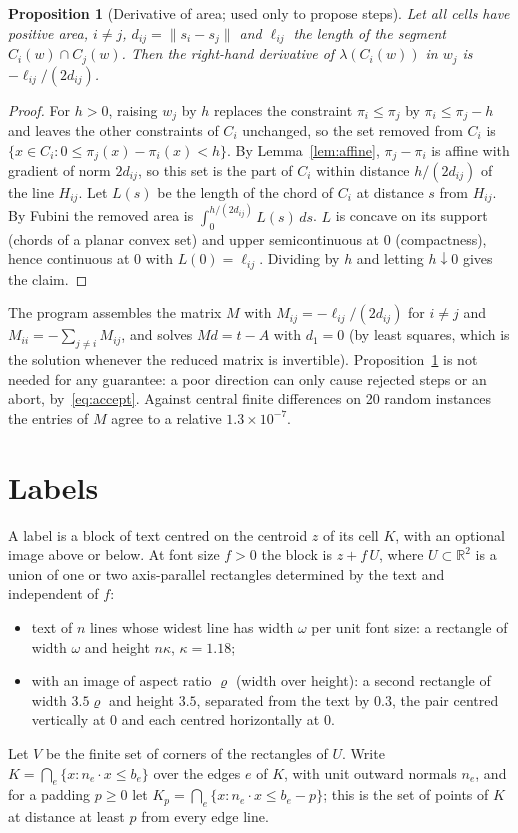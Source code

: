 \documentclass[11pt,a4paper]{article}
\theoremstyle{plain}
\newtheorem{proposition}[theorem]{Proposition}
\theoremstyle{definition}
\theoremstyle{remark}
\newcommand{\R}{\mathbb{R}}
\newcommand{\area}{\lambda}
\newcommand{\norm}[1]{\lVert #1\rVert}
\begin{document}
\begin{proposition}[Derivative of area; used only to propose steps]\label{prop:derivative}
Let all cells have positive area, $i\ne j$, $d_{ij}=\norm{s_i-s_j}$ and
$\ell_{ij}$ the length of the segment $C_i(w)\cap C_j(w)$. Then the
right-hand derivative of $\area(C_i(w))$ in $w_j$ is
$-\ell_{ij}/(2d_{ij})$.
\end{proposition}
\begin{proof}
For $h>0$, raising $w_j$ by $h$ replaces the constraint $\pi_i\le\pi_j$ by
$\pi_i\le\pi_j-h$ and leaves the other constraints of $C_i$ unchanged, so the
set removed from $C_i$ is $\{x\in C_i: 0\le\pi_j(x)-\pi_i(x)<h\}$. By
Lemma~\ref{lem:affine}, $\pi_j-\pi_i$ is affine with gradient of norm
$2d_{ij}$, so this set is the part of $C_i$ within distance $h/(2d_{ij})$ of
the line $H_{ij}$. Let $L(s)$ be the length of the chord of $C_i$ at distance
$s$ from $H_{ij}$. By Fubini the removed area is $\int_0^{h/(2d_{ij})}L(s)\,ds$.
$L$ is concave on its support (chords of a planar convex set) and upper
semicontinuous at $0$ (compactness), hence continuous at $0$ with
$L(0)=\ell_{ij}$. Dividing by $h$ and letting $h\downarrow0$ gives the claim.
\end{proof}

The program assembles the matrix $M$ with $M_{ij}=-\ell_{ij}/(2d_{ij})$ for
$i\ne j$ and $M_{ii}=-\sum_{j\ne i}M_{ij}$, and solves $Md=t-A$ with $d_1=0$ (by least squares, which is the solution whenever the reduced matrix is invertible).
Proposition~\ref{prop:derivative} is not needed for any guarantee: a poor
direction can only cause rejected steps or an abort, by~\eqref{eq:accept}.
Against central finite differences on 20 random instances the entries of $M$
agree to a relative $1.3\times10^{-7}$.

\section{Labels}

A label is a block of text centred on the centroid $z$ of its cell $K$, with
an optional image above or below. At font size $f>0$ the block is
$z+f\,U$, where $U\subset\R^2$ is a union of one or two axis-parallel
rectangles determined by the text and independent of $f$:
\begin{itemize}
\item text of $n$ lines whose widest line has width $\omega$ per unit font
      size: a rectangle of width $\omega$ and height $n\kappa$, $\kappa=1.18$;
\item with an image of aspect ratio $\varrho$ (width over height): a second
      rectangle of width $3.5\varrho$ and height $3.5$, separated from the
      text by $0.3$, the pair centred vertically at $0$ and each centred
      horizontally at $0$.
\end{itemize}
Let $V$ be the finite set of corners of the rectangles of $U$. Write
$K=\bigcap_{e}\{x: n_e\cdot x\le b_e\}$ over the edges $e$ of $K$, with unit
outward normals $n_e$, and for a padding $p\ge0$ let
$K_p=\bigcap_e\{x:n_e\cdot x\le b_e-p\}$; this is the set of points of $K$ at
distance at least $p$ from every edge line.
\end{document}
